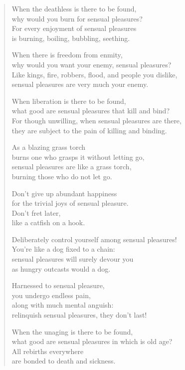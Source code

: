 \documentclass[12pt,openany]{book}%
\begin{document}
\begin{verse}
When the deathless is there to be found, \\
why would you burn for sensual pleasures? \\
For every enjoyment of sensual pleasures \\
is burning, boiling, bubbling, seething. 

When there is freedom from enmity, \\
why would you want your enemy, sensual pleasures? \\
Like kings, fire, robbers, flood, and people you dislike, \\
sensual pleasures are very much your enemy. 

When liberation is there to be found, \\
what good are sensual pleasures that kill and bind? \\
For though unwilling, when sensual pleasures are there, \\
they are subject to the pain of killing and binding. 

As a blazing grass torch \\
burns one who grasps it without letting go, \\
sensual pleasures are like a grass torch, \\
burning those who do not let go. 

Don’t give up abundant happiness \\
for the trivial joys of sensual pleasure. \\
Don’t fret later, \\
like a catfish on a hook. 

Deliberately control yourself among sensual pleasures! \\
You’re like a dog fixed to a chain: \\
sensual pleasures will surely devour you \\
as hungry outcasts would a dog. 

Harnessed to sensual pleasure, \\
you undergo endless pain, \\
along with much mental anguish: \\
relinquish sensual pleasures, they don’t last! 

When the unaging is there to be found, \\
what good are sensual pleasures in which is old age? \\
All rebirths everywhere \\
are bonded to death and sickness. 


\end{verse}
\end{document}
